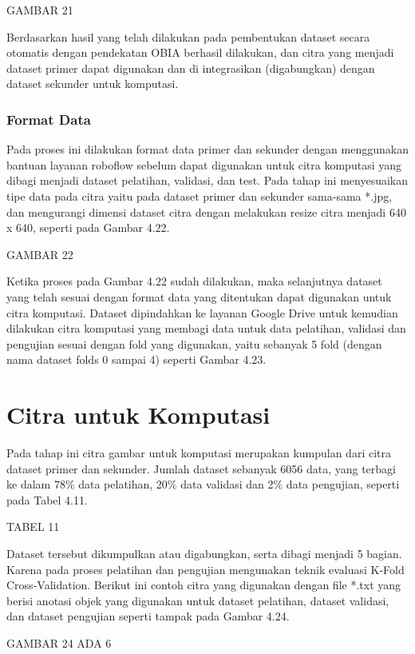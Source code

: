 GAMBAR 21

Berdasarkan hasil yang telah dilakukan pada pembentukan dataset secara otomatis dengan pendekatan OBIA berhasil dilakukan, dan citra yang menjadi dataset primer dapat digunakan dan di integrasikan (digabungkan) dengan dataset sekunder untuk komputasi. 

\subsubsection{Format Data}
\hspace{1,2cm}
Pada proses ini dilakukan format data primer dan sekunder dengan menggunakan bantuan layanan roboflow sebelum dapat digunakan untuk citra komputasi yang dibagi menjadi dataset pelatihan, validasi, dan test.  Pada tahap ini menyesuaikan tipe data pada citra yaitu pada dataset primer dan sekunder sama-sama *.jpg, dan mengurangi dimensi dataset citra dengan melakukan resize citra menjadi 640 x 640, seperti pada Gambar 4.22. 

GAMBAR 22

Ketika proses pada Gambar 4.22 sudah dilakukan, maka selanjutnya dataset yang telah sesuai dengan format data yang ditentukan dapat digunakan untuk citra komputasi. Dataset dipindahkan ke layanan Google Drive untuk kemudian dilakukan citra komputasi yang membagi data untuk data pelatihan, validasi dan pengujian sesuai dengan fold yang digunakan, yaitu sebanyak 5 fold (dengan nama dataset folds 0 sampai 4) seperti Gambar 4.23.

\section{Citra untuk Komputasi}
\hspace{1,2cm}
Pada tahap ini citra gambar untuk komputasi merupakan kumpulan dari citra dataset primer dan sekunder. Jumlah dataset sebanyak 6056 data, yang terbagi ke dalam 78\% data pelatihan, 20\% data validasi dan 2\% data pengujian, seperti pada Tabel 4.11.

TABEL 11

Dataset tersebut dikumpulkan atau digabungkan, serta dibagi menjadi 5 bagian. Karena pada proses pelatihan dan pengujian mengunakan teknik evaluasi K-Fold Cross-Validation. Berikut ini contoh citra yang digunakan dengan file *.txt yang berisi anotasi objek yang digunakan untuk dataset pelatihan, dataset validasi, dan dataset pengujian seperti tampak pada Gambar 4.24.

GAMBAR 24 ADA 6

